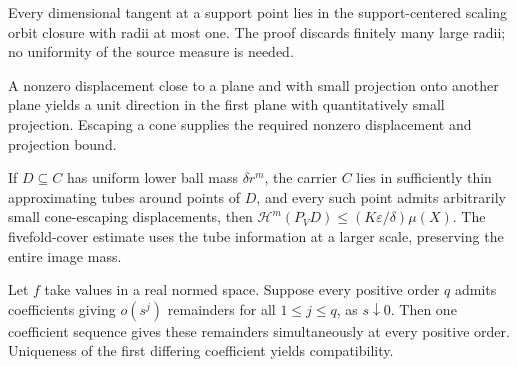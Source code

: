 \begin{lemma}
\label{lem:dimensional-tangent-bounded-orbit}

Every dimensional tangent at a support point lies in the support-centered scaling orbit closure with radii at most one. The proof discards finitely many large radii; no uniformity of the source measure is needed.
\end{lemma}

\begin{lemma}
\label{lem:cone-projection-direction}

A nonzero displacement close to a plane and with small projection onto another plane yields a unit direction in the first plane with quantitatively small projection. Escaping a cone supplies the required nonzero displacement and projection bound.
\end{lemma}

\begin{lemma}
\label{lem:uniform-tube-projection-cover}

If $D\subseteq C$ has uniform lower ball mass $\delta r^m$, the carrier $C$ lies in sufficiently thin approximating tubes around points of $D$, and every such point admits arbitrarily small cone-escaping displacements, then $\mathcal H^m(P_VD)\le (K\varepsilon/\delta)\mu(X)$. The fivefold-cover estimate uses the tube information at a larger scale, preserving the entire image mass.
\end{lemma}

\begin{lemma}
\label{lem:coherent-finite-jets}

Let $f$ take values in a real normed space. Suppose every positive order $q$ admits coefficients giving $o(s^j)$ remainders for all $1\leq j\leq q$, as $s\downarrow0$. Then one coefficient sequence gives these remainders simultaneously at every positive order. Uniqueness of the first differing coefficient yields compatibility.
\end{lemma}

